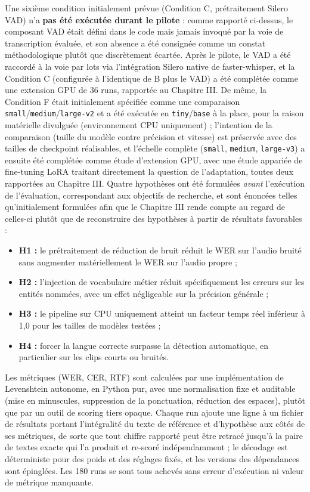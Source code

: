 \documentclass[12pt]{report}
\begin{document}
Une sixième condition initialement prévue (Condition C, prétraitement Silero VAD) n'a \textbf{pas été exécutée durant le pilote} : comme rapporté ci-dessus, le composant VAD était défini dans le code mais jamais invoqué par la voie de transcription évaluée, et son absence a été consignée comme un constat méthodologique plutôt que discrètement écartée. Après le pilote, le VAD a été raccordé à la voie par lots via l'intégration Silero native de faster-whisper, et la Condition C (configurée à l'identique de B plus le VAD) a été complétée comme une extension GPU de 36 runs, rapportée au Chapitre III. De même, la Condition F était initialement spécifiée comme une comparaison \texttt{small}/\texttt{medium}/\texttt{large-v2} et a été exécutée en \texttt{tiny}/\texttt{base} à la place, pour la raison matérielle divulguée (environnement CPU uniquement) ; l'intention de la comparaison (taille du modèle contre précision et vitesse) est préservée avec des tailles de checkpoint réalisables, et l'échelle complète (\texttt{small}, \texttt{medium}, \texttt{large-v3}) a ensuite été complétée comme étude d'extension GPU, avec une étude appariée de fine-tuning LoRA traitant directement la question de l'adaptation, toutes deux rapportées au Chapitre III.
Quatre hypothèses ont été formulées \emph{avant} l'exécution de l'évaluation, correspondant aux objectifs de recherche, et sont énoncées telles qu'initialement formulées afin que le Chapitre III rende compte au regard de celles-ci plutôt que de reconstruire des hypothèses à partir de résultats favorables :
\begin{itemize}
    \item \textbf{H1 :} le prétraitement de réduction de bruit réduit le WER sur l'audio bruité sans augmenter matériellement le WER sur l'audio propre ;
    \item \textbf{H2 :} l'injection de vocabulaire métier réduit spécifiquement les erreurs sur les entités nommées, avec un effet négligeable sur la précision générale ;
    \item \textbf{H3 :} le pipeline sur CPU uniquement atteint un facteur temps réel inférieur à 1,0 pour les tailles de modèles testées ;
    \item \textbf{H4 :} forcer la langue correcte surpasse la détection automatique, en particulier sur les clips courts ou bruités.
\end{itemize}
Les métriques (WER, CER, RTF) sont calculées par une implémentation de Levenshtein autonome, en Python pur, avec une normalisation fixe et auditable (mise en minuscules, suppression de la ponctuation, réduction des espaces), plutôt que par un outil de scoring tiers opaque. Chaque run ajoute une ligne à un fichier de résultats portant l'intégralité du texte de référence et d'hypothèse aux côtés de ses métriques, de sorte que tout chiffre rapporté peut être retracé jusqu'à la paire de textes exacte qui l'a produit et re-scoré indépendamment ; le décodage est déterministe pour des poids et des réglages fixés, et les versions des dépendances sont épinglées. Les 180 runs se sont tous achevés sans erreur d'exécution ni valeur de métrique manquante.
\end{document}
